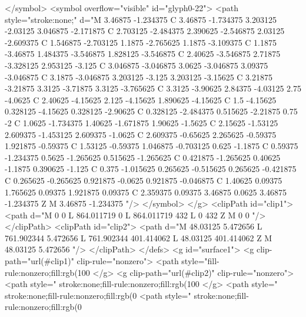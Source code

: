 </symbol>
<symbol overflow="visible" id="glyph0-22">
<path style="stroke:none;" d="M 3.46875 -1.234375 C 3.46875 -1.734375 3.203125 -2.03125 3.046875 -2.171875 C 2.703125 -2.484375 2.390625 -2.546875 2.03125 -2.609375 C 1.546875 -2.703125 1.1875 -2.765625 1.1875 -3.109375 C 1.1875 -3.46875 1.484375 -3.546875 1.828125 -3.546875 C 2.40625 -3.546875 2.71875 -3.328125 2.953125 -3.125 C 3.046875 -3.046875 3.0625 -3.046875 3.09375 -3.046875 C 3.1875 -3.046875 3.203125 -3.125 3.203125 -3.15625 C 3.21875 -3.21875 3.3125 -3.71875 3.3125 -3.765625 C 3.3125 -3.90625 2.84375 -4.03125 2.75 -4.0625 C 2.40625 -4.15625 2.125 -4.15625 1.890625 -4.15625 C 1.5 -4.15625 0.328125 -4.15625 0.328125 -2.90625 C 0.328125 -2.484375 0.515625 -2.21875 0.75 -2 C 1.0625 -1.734375 1.40625 -1.671875 1.90625 -1.5625 C 2.15625 -1.53125 2.609375 -1.453125 2.609375 -1.0625 C 2.609375 -0.65625 2.265625 -0.59375 1.921875 -0.59375 C 1.53125 -0.59375 1.046875 -0.703125 0.625 -1.1875 C 0.59375 -1.234375 0.5625 -1.265625 0.515625 -1.265625 C 0.421875 -1.265625 0.40625 -1.1875 0.390625 -1.125 C 0.375 -1.015625 0.265625 -0.515625 0.265625 -0.421875 C 0.265625 -0.265625 0.921875 -0.0625 0.921875 -0.046875 C 1.40625 0.09375 1.765625 0.09375 1.921875 0.09375 C 2.359375 0.09375 3.46875 0.0625 3.46875 -1.234375 Z M 3.46875 -1.234375 "/>
</symbol>
</g>
<clipPath id="clip1">
  <path d="M 0 0 L 864.011719 0 L 864.011719 432 L 0 432 Z M 0 0 "/>
</clipPath>
<clipPath id="clip2">
  <path d="M 48.03125 5.472656 L 761.902344 5.472656 L 761.902344 401.414062 L 48.03125 401.414062 Z M 48.03125 5.472656 "/>
</clipPath>
</defs>
<g id="surface1">
<g clip-path="url(#clip1)" clip-rule="nonzero">
<path style="fill-rule:nonzero;fill:rgb(100%
</g>
<g clip-path="url(#clip2)" clip-rule="nonzero">
<path style=" stroke:none;fill-rule:nonzero;fill:rgb(100%
</g>
<path style=" stroke:none;fill-rule:nonzero;fill:rgb(0%
<path style=" stroke:none;fill-rule:nonzero;fill:rgb(0%
